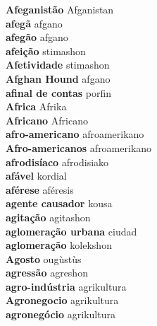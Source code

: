\textbf{ Afeganistão  } Afganistan \\
\textbf{ afegã  } afgano \\
\textbf{ afegão  } afgano \\
\textbf{ afeição  } stimashon \\
\textbf{ Afetividade  } stimashon \\
\textbf{ Afghan Hound  } afgano \\
\textbf{ afinal de contas  } porfin \\
\textbf{ Africa  } Afrika \\
\textbf{ Africano  } Africano \\
\textbf{ afro-americano  } afroamerikano \\
\textbf{ Afro-americanos  } afroamerikano \\
\textbf{ afrodisíaco  } afrodisiako \\
\textbf{ afável  } kordial \\
\textbf{ aférese  } aféresis \\
\textbf{ agente causador  } kousa \\
\textbf{ agitação  } agitashon \\
\textbf{ aglomeração urbana  } ciudad \\
\textbf{ aglomeração  } kolekshon \\
\textbf{ Agosto  } ougùstùs \\
\textbf{ agressão  } agreshon \\
\textbf{ agro-indústria  } agrikultura \\
\textbf{ Agronegocio  } agrikultura \\
\textbf{ agronegócio  } agrikultura \\
